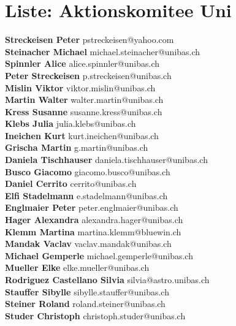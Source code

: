 \documentclass{scrartcl}
\begin{document}
\section*{Liste: Aktionskomitee Uni}
\textbf{Streckeisen Peter } pstreckeisen@yahoo.com\\
\textbf{Steinacher Michael } michael.steinacher@unibas.ch\\
\textbf{Spinnler Alice } alice.spinnler@unibas.ch\\
\textbf{Peter Streckeisen } p.streckeisen@unibas.ch\\
\textbf{Mislin Viktor } viktor.mislin@unibas.ch\\
\textbf{Martin Walter } walter.martin@unibas.ch\\
\textbf{Kress Susanne } susanne.kress@unibas.ch\\
\textbf{Klebs Julia } julia.klebs@unibas.ch\\
\textbf{Ineichen Kurt } kurt.ineichen@unibas.ch\\
\textbf{Grischa Martin } g.martin@unibas.ch\\
\textbf{Daniela Tischhauser } daniela.tischhauser@unibas.ch\\
\textbf{Busco Giacomo } giacomo.busco@unibas.ch\\
\textbf{Daniel Cerrito } cerrito@unibas.ch\\
\textbf{Elfi Stadelmann } e.stadelmann@unibas.ch\\
\textbf{Englmaier Peter } peter.englmaier@unibas.ch\\
\textbf{Hager Alexandra } alexandra.hager@unibas.ch\\
\textbf{Klemm Martina } martina.klemm@bluewin.ch\\
\textbf{Mandak Vaclav } vaclav.mandak@unibas.ch\\
\textbf{Michael Gemperle } michael.gemperle@unibas.ch\\
\textbf{Mueller Elke } elke.mueller@unibas.ch\\
\textbf{Rodriguez Castellano Silvia } silvia@astro.unibas.ch\\
\textbf{Stauffer Sibylle } sibylle.stauffer@unibas.ch\\
\textbf{Steiner Roland } roland.steiner@unibas.ch\\
\textbf{Studer Christoph } christoph.studer@unibas.ch\\
\end{document}
